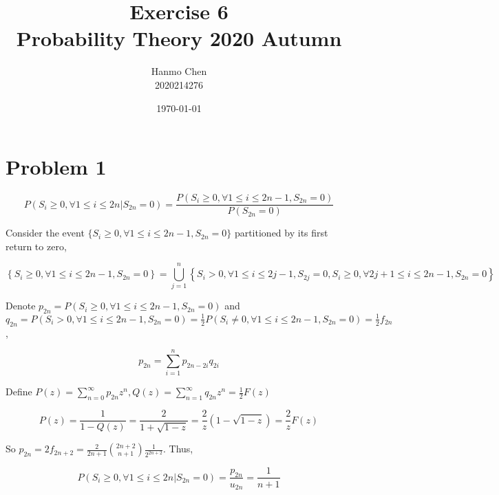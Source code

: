 \documentclass{article}
\title{Exercise 6 \\ Probability Theory 2020 Autumn}
\author{Hanmo Chen \\ 2020214276}
\date{\today}
\begin{document}
\maketitle

\section{Problem 1}

\begin{equation}
    P(S_i\geqslant 0, \forall 1\leqslant i \leqslant 2n |S_{2n} = 0 ) = \frac{P(S_i\geqslant 0, \forall 1\leqslant i \leqslant 2n-1 ,S_{2n} = 0 )}{P(S_{2n} = 0)}
\end{equation}

Consider the event $\{S_i\geqslant 0, \forall 1\leqslant i \leqslant 2n-1 ,S_{2n} = 0\}$ partitioned by its first return to zero,

\begin{equation}
    \left\{S_i\geqslant 0, \forall 1\leqslant i \leqslant 2n-1 ,S_{2n} = 0\right\} = \bigcup_{j=1}^{n}\left\{S_i> 0, \forall 1\leqslant i \leqslant 2j-1 ,S_{2j} = 0,S_{i} \geqslant 0,\forall 2j+1\leqslant i \leqslant 2n-1,S_{2n} = 0 \right\}
\end{equation}

Denote $p_{2n} = P(S_i\geqslant 0, \forall 1\leqslant i \leqslant 2n-1 ,S_{2n} = 0 )$ and $q_{2n} = P(S_i> 0, \forall 1\leqslant i \leqslant 2n-1 ,S_{2n} = 0 )  = \frac{1}{2} P(S_i\neq 0, \forall 1\leqslant i \leqslant 2n-1 ,S_{2n} = 0 ) = \frac{1}{2} f_{2n}$, 



\begin{equation}
    p_{2n} = \sum_{i=1}^n p_{2n-2i} q_{2i}
\end{equation}

Define $P(z)= \sum_{n=0}^{\infty} p_{2n} z^n , Q(z) = \sum_{n=1}^{\infty}q_{2n} z^n = \frac{1}{2} F(z)$


\begin{equation}
    P(z) = \frac{1}{1- Q (z)} = \frac{2}{1+\sqrt{1-z}} = \frac{2}{z} (1-\sqrt{1-z}) =\frac{2}{z} F(z)
\end{equation}


So $p_{2n} =2f_{2n+2} = \frac{2}{2n+1} \binom{2n+2}{n+1} \frac{1}{2^{2n+2}}$. Thus,

\begin{equation}
    P(S_i\geqslant 0, \forall 1\leqslant i \leqslant 2n |S_{2n} = 0 ) =  \frac{p_{2n}}{u_{2n}} = \frac{1}{n+1}
\end{equation}
\end{document}
